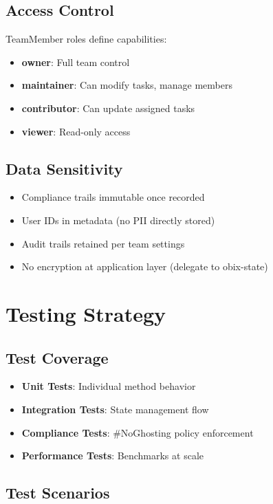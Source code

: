 \documentclass[12pt,a4paper]{article}
\begin{document}
\subsection{Access Control}

TeamMember roles define capabilities:
\begin{itemize}
  \item \textbf{owner}: Full team control
  \item \textbf{maintainer}: Can modify tasks, manage members
  \item \textbf{contributor}: Can update assigned tasks
  \item \textbf{viewer}: Read-only access
\end{itemize}

\subsection{Data Sensitivity}

\begin{itemize}
  \item Compliance trails immutable once recorded
  \item User IDs in metadata (no PII directly stored)
  \item Audit trails retained per team settings
  \item No encryption at application layer (delegate to obix-state)
\end{itemize}

\section{Testing Strategy}

\subsection{Test Coverage}

\begin{itemize}
  \item \textbf{Unit Tests}: Individual method behavior
  \item \textbf{Integration Tests}: State management flow
  \item \textbf{Compliance Tests}: \#NoGhosting policy enforcement
  \item \textbf{Performance Tests}: Benchmarks at scale
\end{itemize}

\subsection{Test Scenarios}
\end{document}
